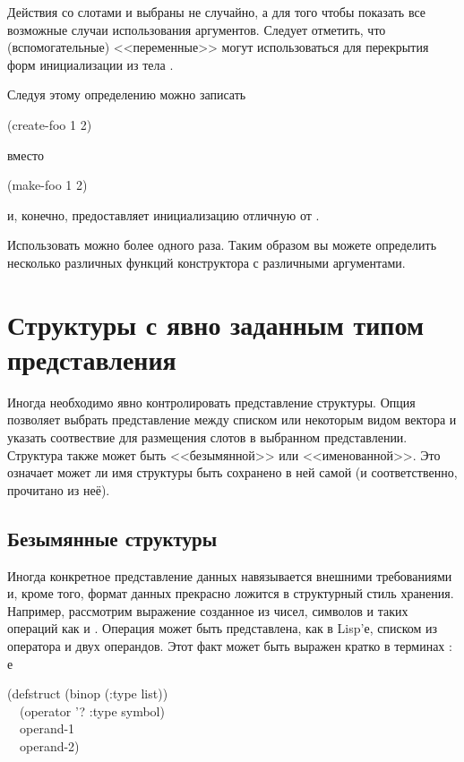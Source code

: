 Действия со слотами  и  выбраны не случайно, а для того чтобы
показать все возможные случаи использования аргументов.
Следует отметить, что  (вспомогательные) <<переменные>> могут
использоваться для перекрытия форм инициализации из тела .

Следуя этому определению можно записать
\begin{lisp}
(create-foo 1 2)
\end{lisp}
вместо
\begin{lisp}
(make-foo  1  2)
\end{lisp}
и, конечно,  предоставляет инициализацию отличную от
.

Использовать  можно более одного раза. Таким образом вы можете
определить несколько различных функций конструктора с различными аргументами.

\section{Структуры с явно заданным типом представления}
\label{EXPLICIT-TYPE-STRUCTURES}

Иногда необходимо явно контролировать представление структуры. Опция 
позволяет выбрать представление между списком или некоторым видом вектора и
указать соотвествие для размещения слотов в выбранном представлении.
Структура также может быть <<безымянной>> или <<именованной>>. Это означает
может ли имя структуры быть сохранено в ней самой (и соответственно, прочитано
из неё).

\subsection{Безымянные структуры}

Иногда конкретное представление данных навязывается внешними требованиями и,
кроме того, формат данных прекрасно ложится в структурный стиль хранения.
Например, рассмотрим выражение созданное из чисел, символов и таких операций как
\cdf{+} и \cdf{*}. Операция может быть представлена, как в Lisp'е, списком из
оператора и двух операндов. Этот факт может быть выражен кратко в терминах
:
е\begin{lisp}
(defstruct (binop (:type list)) \\
~~(operator '? :type symbol) \\
~~operand-1 \\
~~operand-2)
\end{lisp}

